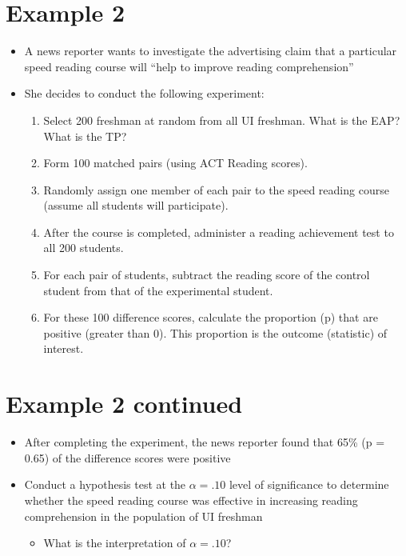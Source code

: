 \documentclass[12pt]{article}
\begin{document}
\section{Example 2}\label{example-2}

\begin{itemize}
\itemsep1pt\parskip0pt
\item
  A news reporter wants to investigate the advertising claim that a
  particular speed reading course will ``help to improve reading
  comprehension''
\item
  She decides to conduct the following experiment:

  \begin{enumerate}
  \def\labelenumi{\arabic{enumi}.}
  \itemsep1pt\parskip0pt
  \item
    Select 200 freshman at random from all UI freshman. What is the EAP?
    What is the TP?
  \item
    Form 100 matched pairs (using ACT Reading scores).
  \item
    Randomly assign one member of each pair to the speed reading course
    (assume all students will participate).
  \item
    After the course is completed, administer a reading achievement test
    to all 200 students.
  \item
    For each pair of students, subtract the reading score of the control
    student from that of the experimental student.
  \item
    For these 100 difference scores, calculate the proportion (p) that
    are positive (greater than 0). This proportion is the outcome
    (statistic) of interest.
  \end{enumerate}
\end{itemize}

\section{Example 2 continued}\label{example-2-continued}

\begin{itemize}
\itemsep1pt\parskip0pt
\item
  After completing the experiment, the news reporter found that 65\% (p
  = 0.65) of the difference scores were positive
\item
  Conduct a hypothesis test at the \(\alpha = .10\) level of
  significance to determine whether the speed reading course was
  effective in increasing reading comprehension in the population of UI
  freshman

  \begin{itemize}
  \itemsep1pt\parskip0pt
  \item
    What is the interpretation of \(\alpha = .10\)?
  \end{itemize}
\end{itemize}
\end{document}
